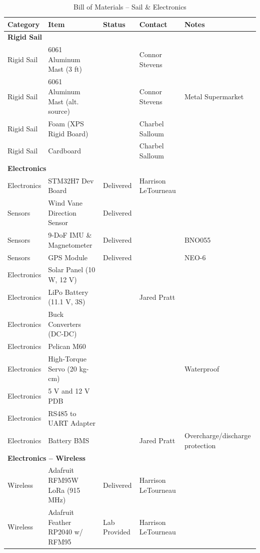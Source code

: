 \begin{table}[htbp]
\centering
\caption{Bill of Materials -- Sail \& Electronics}
\footnotesize
\begin{tabular}{|p{2.2cm}|p{5.5cm}|p{2.2cm}|p{2.5cm}|p{3.5cm}|}
\hline
\textbf{Category} & \textbf{Item} & \textbf{Status} & \textbf{Contact} & \textbf{Notes} \\
\hline
\multicolumn{5}{|l|}{\textbf{Rigid Sail}} \\
\hline
Rigid Sail & 6061 Aluminum Mast (3 ft) & & Connor Stevens & \\
\hline
Rigid Sail & 6061 Aluminum Mast (alt. source) & & Connor Stevens & Metal Supermarket \\
\hline
Rigid Sail & Foam (XPS Rigid Board) & & Charbel Salloum & \\
\hline
Rigid Sail & Cardboard & & Charbel Salloum & \\
\hline
\multicolumn{5}{|l|}{\textbf{Electronics}} \\
\hline
Electronics & STM32H7 Dev Board & Delivered & Harrison LeTourneau & \\
\hline
Sensors & Wind Vane Direction Sensor & Delivered & & \\
\hline
Sensors & 9-DoF IMU \& Magnetometer & Delivered & & BNO055 \\
\hline
Sensors & GPS Module & Delivered & & NEO-6 \\
\hline
Electronics & Solar Panel (10 W, 12 V) & & & \\
\hline
Electronics & LiPo Battery (11.1 V, 3S) & & Jared Pratt & \\
\hline
Electronics & Buck Converters (DC-DC) & & & \\
\hline
Electronics & Pelican M60 & & & \\
\hline
Electronics & High-Torque Servo (20 kg-cm) & & & Waterproof \\
\hline
Electronics & 5 V and 12 V PDB & & & \\
\hline
Electronics & RS485 to UART Adapter & & & \\
\hline
Electronics & Battery BMS & & Jared Pratt & Overcharge/discharge protection \\
\hline
\multicolumn{5}{|l|}{\textbf{Electronics -- Wireless}} \\
\hline
Wireless & Adafruit RFM95W LoRa (915 MHz) & Delivered & Harrison LeTourneau & \\
\hline
Wireless & Adafruit Feather RP2040 w/ RFM95 & Lab Provided & Harrison LeTourneau & \\
\hline

\end{tabular}
\end{table}
